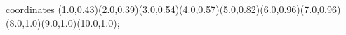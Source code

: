 					coordinates { (1.0,0.43)(2.0,0.39)(3.0,0.54)(4.0,0.57)(5.0,0.82)(6.0,0.96)(7.0,0.96)(8.0,1.0)(9.0,1.0)(10.0,1.0)};